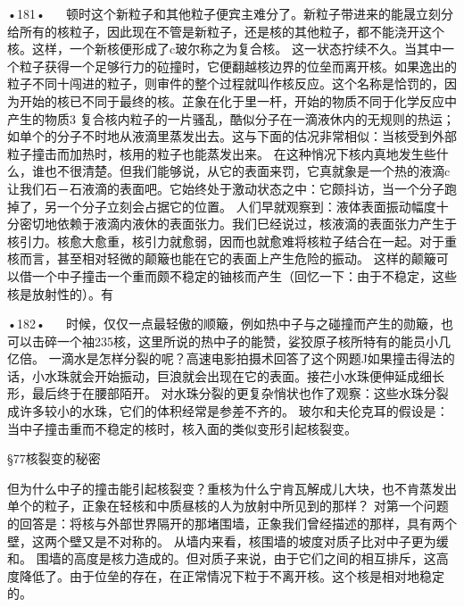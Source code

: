 •181•
  
顿时这个新粒子和其他粒子便宾主难分了。新粒子带进来的能晟立刻分给所有的核粒子，因此现在不管是新粒子，还是核的其他粒子，都不能浇开这个核。这样，一个新核便形成了c玻尔称之为复合核。
这一状态拧续不久。当其中一个粒子获得一个足够行力的砬撞时，它便翻越核边界的位垒而离开核。如果逸出的粒子不同十闯进的粒子，则审件的整个过程就叫作核反应。这个名称是恰罚的，因为开始的核已不同于最终的核。芷象在化于里一杆，开始的物质不同于化学反应中产生的物质3
复合核内粒子的一片骚乱，酷似分子在一滴液休内的无规则的热运；如单个的分子不时地从液滴里蒸发出去。这与下面的估况非常相似：当核受到外部粒子撞击而加热时，核用的粒子也能蒸发出来。
在这种悄况下核内真地发生些什么，谁也不很清楚。但我们能够说，从它的表面来罚，它真就象是一个热的液滴c让我们石－石液滴的表面吧。它始终处于激动状态之中：它颇抖访，当一个分子跑掉了，另一个分子立刻会占据它的位置。
人们早就观察到：液体表面振动幅度十分密切地依赖于液滴内液休的表面张力。我们巳经说过，核液滴的表面张力产生于核引力。核愈大愈重，核引力就愈弱，因而也就愈难将核粒子结合在一起。对于重核而言，甚至相对轻微的颠簸也能在它的表面上产生危险的振动。
这样的颠簸可以借一个中子撞击一个重而颇不稳定的铀核而产生（回忆一下：由于不稳定，这些核是放射性的）。有

•182•
  
时候，仅仅一点最轻傲的顺簸，例如热中子与之碰撞而产生的勋簸，也可以击碎一个袖235核，这里所说的热中子的能赞，娑狡原子核所特有的能员小几亿倍。
一滴水是怎样分裂的呢？高速电影拍摄术回答了这个网题J如果撞击得法的话，小水珠就会开始振动，巨浪就会出现在它的表面。接芢小水珠便伸延成细长形，最后终于在腰部陌开。
对水珠分裂的更复杂悄状也作了观察：这些水珠分裂成许多较小的水珠，它们的体积经常是参差不齐的。
玻尔和夫伦克耳的假设是：当中子撞击重而不稳定的核时，核入面的类似变形引起核裂变。

§77核裂变的秘密

但为什么中子的撞击能引起核裂变？重核为什么宁肯瓦解成儿大块，也不肯蒸发出单个的粒子，正象在轻核和中质昼核的人为放射中所见到的那样？
对第一个问题的回答是：将核与外部世界隔开的那堵围墙，正象我们曾经描述的那样，具有两个壁，这两个壁又是不对称的。
从墙内来看，核围墙的坡度对质子比对中子更为缓和。
围墙的高度是核力造成的。但对质子来说，由于它们之间的相互排斥，这高度降低了。由于位垒的存在，在正常情况下粒于不离开核。这个核是相对地稳定的。

